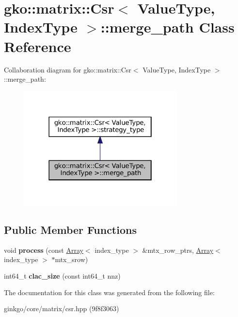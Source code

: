 \hypertarget{classgko_1_1matrix_1_1Csr_1_1merge__path}{}\section{gko\+:\+:matrix\+:\+:Csr$<$ Value\+Type, Index\+Type $>$\+:\+:merge\+\_\+path Class Reference}
\label{classgko_1_1matrix_1_1Csr_1_1merge__path}


Collaboration diagram for gko\+:\+:matrix\+:\+:Csr$<$ Value\+Type, Index\+Type $>$\+:\+:merge\+\_\+path\+:
\nopagebreak
\begin{figure}[H]
\begin{center}
\leavevmode
\includegraphics[width=238pt]{classgko_1_1matrix_1_1Csr_1_1merge__path__coll__graph}
\end{center}
\end{figure}
\subsection*{Public Member Functions}
\begin{DoxyCompactItemize}
\item 
\mbox{\label{classgko_1_1matrix_1_1Csr_1_1merge__path_a617d0a285a7851c025a56bf1ae096bc7}} 
void {\bfseries process} (const \hyperlink{classgko_1_1Array}{Array}$<$ index\+\_\+type $>$ \&mtx\+\_\+row\+\_\+ptrs, \hyperlink{classgko_1_1Array}{Array}$<$ index\+\_\+type $>$ $\ast$mtx\+\_\+srow)
\item 
\mbox{\label{classgko_1_1matrix_1_1Csr_1_1merge__path_aea68ffff5b689f63bbece61d5dc80112}} 
int64\+\_\+t {\bfseries clac\+\_\+size} (const int64\+\_\+t nnz)
\end{DoxyCompactItemize}


The documentation for this class was generated from the following file\+:\begin{DoxyCompactItemize}
\item 
ginkgo/core/matrix/csr.\+hpp (9f8f3063)\end{DoxyCompactItemize}
